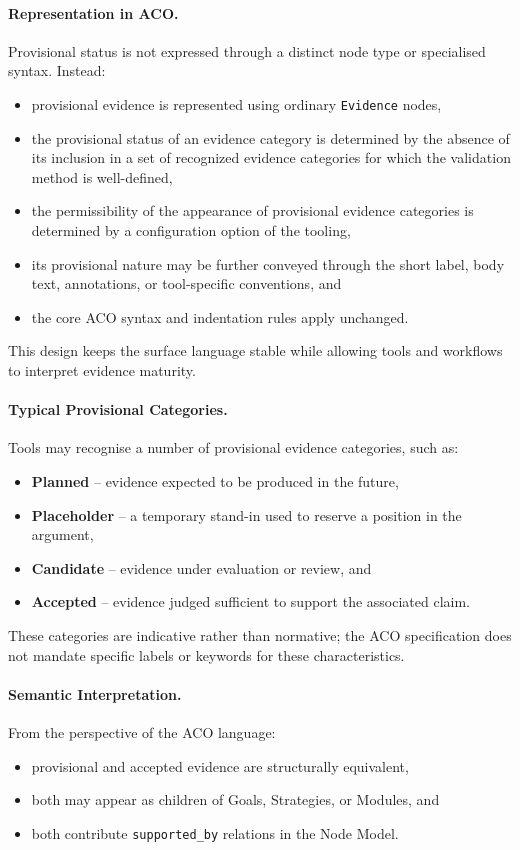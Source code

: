 \documentclass[11pt]{article}
\begin{document}
\paragraph{Representation in ACO.}
Provisional status is not expressed through a distinct node type or specialised
syntax. Instead:
\begin{itemize}[leftmargin=2em]
  \item provisional evidence is represented using ordinary \texttt{Evidence} nodes,
  \item the provisional status of an evidence category is determined by the absence of its inclusion in a set of recognized evidence categories for which the validation method is well-defined,
  \item the permissibility of the appearance of provisional evidence categories is determined by a configuration option of the tooling,
  \item its provisional nature may be further conveyed through the short label, body text,
        annotations, or tool-specific conventions, and
  \item the core ACO syntax and indentation rules apply unchanged.
\end{itemize}

This design keeps the surface language stable while allowing tools and workflows
to interpret evidence maturity.

\paragraph{Typical Provisional Categories.}
Tools may recognise a number of provisional evidence categories, such as:
\begin{itemize}[leftmargin=2em]
  \item \textbf{Planned} -- evidence expected to be produced in the future,
  \item \textbf{Placeholder} -- a temporary stand-in used to reserve a position in the argument,
  \item \textbf{Candidate} -- evidence under evaluation or review, and
  \item \textbf{Accepted} -- evidence judged sufficient to support the associated claim.
\end{itemize}

These categories are indicative rather than normative; the ACO specification does
not mandate specific labels or keywords for these characteristics.

\paragraph{Semantic Interpretation.}
From the perspective of the ACO language:
\begin{itemize}[leftmargin=2em]
  \item provisional and accepted evidence are structurally equivalent,
  \item both may appear as children of Goals, Strategies, or Modules, and
  \item both contribute \texttt{supported\_by} relations in the Node Model.
\end{itemize}
\end{document}
